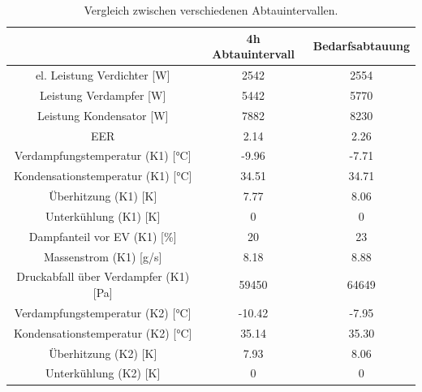 \begin{table}[h!]
\centering
\caption{Vergleich zwischen verschiedenen Abtauintervallen.}
\label{tab:Vergleich4h3h}
\begin{tabular}{|ccc|}
\hline
                                                                & 4h Abtauintervall           & Bedarfsabtauung \\ \hline
\multicolumn{1}{|c|}{el. Leistung Verdichter {[}W{]}}           & \multicolumn{1}{c|}{2542}   & 2554              \\
\multicolumn{1}{|c|}{Leistung Verdampfer {[}W{]}}               & \multicolumn{1}{c|}{5442}   & 5770              \\
\multicolumn{1}{|c|}{Leistung Kondensator {[}W{]}}             & \multicolumn{1}{c|}{7882}   & 8230              \\
\multicolumn{1}{|c|}{EER}                                       & \multicolumn{1}{c|}{2.14}   & 2.26              \\ \hline
\multicolumn{1}{|c|}{Verdampfungstemperatur (K1) {[}°C{]}}      & \multicolumn{1}{c|}{-9.96}  & -7.71             \\
\multicolumn{1}{|c|}{Kondensationstemperatur (K1) {[}°C{]}}    & \multicolumn{1}{c|}{34.51}  & 34.71             \\
\multicolumn{1}{|c|}{Überhitzung (K1) {[}K{]}}                  & \multicolumn{1}{c|}{7.77}   & 8.06              \\
\multicolumn{1}{|c|}{Unterkühlung (K1) {[}K{]}}                 & \multicolumn{1}{c|}{0}      & 0                 \\
\multicolumn{1}{|c|}{Dampfanteil vor EV (K1) {[}\%{]}}          & \multicolumn{1}{c|}{20}     & 23                \\
\multicolumn{1}{|c|}{Massenstrom (K1) {[}g/s{]}}                & \multicolumn{1}{c|}{8.18}   & 8.88              \\
\multicolumn{1}{|c|}{Druckabfall über Verdampfer (K1) {[}Pa{]}} & \multicolumn{1}{c|}{59450}  & 64649             \\ \hline
\multicolumn{1}{|c|}{Verdampfungstemperatur (K2) {[}°C{]}}      & \multicolumn{1}{c|}{-10.42} & -7.95             \\
\multicolumn{1}{|c|}{Kondensationstemperatur (K2) {[}°C{]}}    & \multicolumn{1}{c|}{35.14}  & 35.30             \\
\multicolumn{1}{|c|}{Überhitzung (K2) {[}K{]}}                  & \multicolumn{1}{c|}{7.93}   & 8.06              \\
\multicolumn{1}{|c|}{Unterkühlung (K2) {[}K{]}}                 & \multicolumn{1}{c|}{0}      & 0                 \\

\end{tabular}
\end{table}

